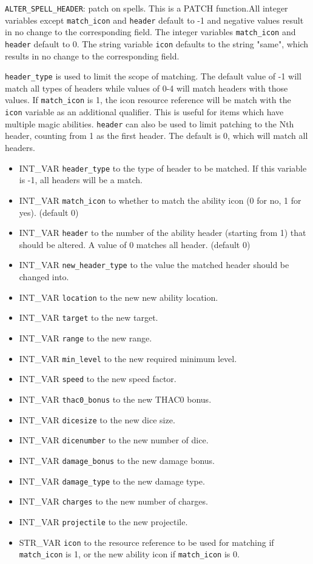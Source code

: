 \documentclass{article}
\begin{document}
\verb+ALTER_SPELL_HEADER+: patch  on spells. This is a PATCH function.All integer variables except \verb+match_icon+ and \verb+header+ default to -1 and negative values result in no change to the corresponding field. The integer variables \verb+match_icon+ and \verb+header+ default to 0. The string variable \verb+icon+ defaults to the string "same", which results in no change to the corresponding field.

\verb+header_type+ is used to limit the scope of matching. The default value of -1 will match all types of headers while values of 0-4 will match headers with those values. If \verb+match_icon+ is 1, the icon resource reference will be match with the \verb+icon+ variable as an additional qualifier. This is useful for items which have multiple magic abilities. \verb+header+ can also be used to limit patching to the Nth header, counting from 1 as the first header. The default is 0, which will match all headers.

\begin{itemize}
\item INT_VAR \verb+header_type+ to the type of header to be matched. If this variable is -1, all headers will be a match.
\item INT_VAR \verb+match_icon+ to whether to match the ability icon (0 for no, 1 for yes). (default 0)
\item INT_VAR \verb+header+ to the number of the ability header (starting from 1) that should be altered. A value of 0 matches all header. (default 0)
\item INT_VAR \verb+new_header_type+ to the value the matched header should be changed into.
\item INT_VAR \verb+location+ to the new new ability location.
\item INT_VAR \verb+target+ to the new target.
\item INT_VAR \verb+range+ to the new range.
\item INT_VAR \verb+min_level+ to the new required minimum level.
\item INT_VAR \verb+speed+ to the new speed factor.
\item INT_VAR \verb+thac0_bonus+ to the new THAC0 bonus.
\item INT_VAR \verb+dicesize+ to the new dice size.
\item INT_VAR \verb+dicenumber+ to the new number of dice.
\item INT_VAR \verb+damage_bonus+ to the new damage bonus.
\item INT_VAR \verb+damage_type+ to the new damage type.
\item INT_VAR \verb+charges+ to the new number of charges.
\item INT_VAR \verb+projectile+ to the new projectile.
\item STR_VAR \verb+icon+ to the resource reference to be used for matching if \verb+match_icon+ is 1, or the new ability icon if \verb+match_icon+ is 0.
\end{itemize}
\\
\end{document}
